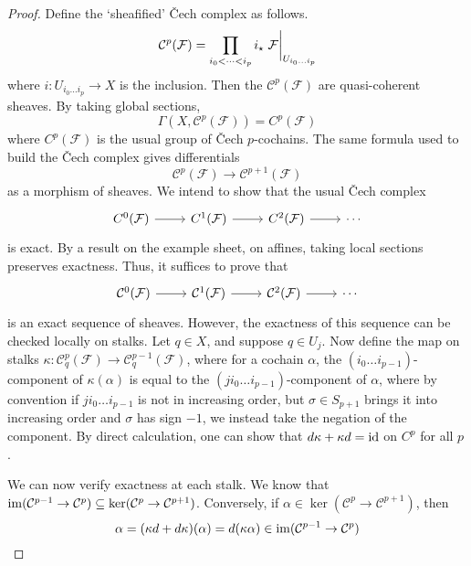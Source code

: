 \begin{proof}
	Define the `sheafified' \v{C}ech complex as follows.
	\[ \mathcal C^p(\mathcal F) = \prod_{i_0 < \dots < i_p} i_\star \eval{\mathcal F}_{U_{i_0 \dots i_p}} \]
	where \( i : U_{i_0 \dots i_p} \to X \) is the inclusion.
	Then the \( \mathcal C^p(\mathcal F) \) are quasi-coherent sheaves.
	By taking global sections,
	\[ \Gamma(X, \mathcal C^p(\mathcal F)) = C^p(\mathcal F) \]
	where \( C^p(\mathcal F) \) is the usual group of \v{C}ech \( p \)-cochains.
	The same formula used to build the \v{C}ech complex gives differentials
	\[ \mathcal C^p(\mathcal F) \to \mathcal C^{p+1}(\mathcal F) \]
	as a morphism of sheaves.
	We intend to show that the usual \v{C}ech complex
\[\begin{tikzcd}
	{C^0(\mathcal F)} & {C^1(\mathcal F)} & {C^2(\mathcal F)} & \cdots
	\arrow[from=1-1, to=1-2]
	\arrow[from=1-2, to=1-3]
	\arrow[from=1-3, to=1-4]
\end{tikzcd}\]
	is exact.
	By a result on the example sheet, on affines, taking local sections preserves exactness.
	Thus, it suffices to prove that
\[\begin{tikzcd}
	{\mathcal C^0(\mathcal F)} & {\mathcal C^1(\mathcal F)} & {\mathcal C^2(\mathcal F)} & \cdots
	\arrow[from=1-1, to=1-2]
	\arrow[from=1-2, to=1-3]
	\arrow[from=1-3, to=1-4]
\end{tikzcd}\]
	is an exact sequence of sheaves.
	However, the exactness of this sequence can be checked locally on stalks.
	Let \( q \in X \), and suppose \( q \in U_j \).
	Now define the map on stalks \( \kappa : \mathcal C^p_q(\mathcal F) \to \mathcal C^{p-1}_q(\mathcal F) \), where for a cochain \( \alpha \), the \( (i_0 \dots i_{p-1}) \)-component of \( \kappa(\alpha) \) is equal to the \( (ji_0 \dots i_{p-1}) \)-component of \( \alpha \), where by convention if \( j i_0 \dots i_{p-1} \) is not in increasing order, but \( \sigma \in S_{p+1} \) brings it into increasing order and \( \sigma \) has sign \( -1 \), we instead take the negation of the component.
	By direct calculation, one can show that \( d \kappa + \kappa d = \operatorname{id} \) on \( C^p \) for all \( p \).

	We can now verify exactness at each stalk.
	We know that \( \operatorname{im} (\mathcal C^{p-1} \to \mathcal C^p) \subseteq \ker (\mathcal C^p \to \mathcal C^{p+1}) \).
	Conversely, if \( \alpha \in \ker (\mathcal C^p \to \mathcal C^{p+1}) \), then
	\[ \alpha = (\kappa d + d \kappa)(\alpha) = d(\kappa \alpha) \in \operatorname{im} (\mathcal C^{p-1} \to \mathcal C^p) \]
\end{proof}
